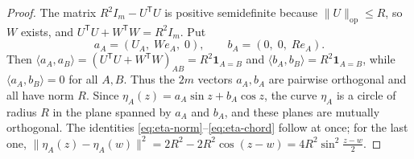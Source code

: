 \documentclass[11pt]{amsart}
\numberwithin{equation}{section}
\theoremstyle{definition}
\theoremstyle{remark}
\newcommand{\ip}[2]{\langle #1,#2\rangle}
\newcommand{\norm}[1]{\lVert #1\rVert}
\newcommand{\opnorm}[1]{\lVert #1\rVert_{\mathrm{op}}}
\newcommand{\T}{\mathsf T}          %
\newcommand{\one}{\mathbf 1}
\begin{document}
\begin{proof}
The matrix $R^2I_m-U^\T U$ is positive semidefinite because
$\opnorm U\le R$, so $W$ exists, and $U^\T U+W^\T W=R^2I_m$. Put
\[
 a_A=(U_A,\;We_A,\;0),\qquad b_A=(0,\;0,\;Re_A).
\]
Then $\ip{a_A}{a_B}=(U^\T U+W^\T W)_{AB}=R^2\one_{A=B}$ and
$\ip{b_A}{b_B}=R^2\one_{A=B}$, while $\ip{a_A}{b_B}=0$ for all $A,B$.
Thus the $2m$ vectors $a_A,b_A$ are pairwise orthogonal and all have norm
$R$. Since $\eta_A(z)=a_A\sin z+b_A\cos z$, the curve $\eta_A$ is a circle
of radius $R$ in the plane spanned by $a_A$ and $b_A$, and these planes are
mutually orthogonal. The identities
\eqref{eq:eta-norm}--\eqref{eq:eta-chord} follow at once; for the last
one, $\norm{\eta_A(z)-\eta_A(w)}^2=2R^2-2R^2\cos(z-w)=4R^2\sin^2\frac{z-w}2$.
\end{proof}
\end{document}

